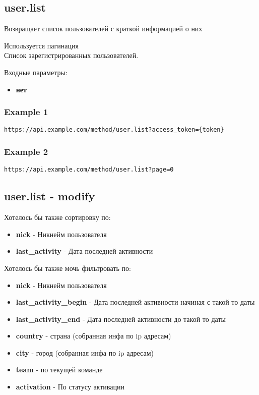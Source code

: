 \subsection{user.list}
Возвращает список пользователей с краткой информацией о них

Используется пагинация \\
Список зарегистрированных пользователей.

Входные параметры:
\begin{itemize}
  \item \textbf{нет}
\end{itemize}

\subsubsection{Example 1}
\begin{Verbatim}[frame=single]
https://api.example.com/method/user.list?access_token={token}
\end{Verbatim}

\subsubsection{Example 2}
\begin{Verbatim}[frame=single]
https://api.example.com/method/user.list?page=0
\end{Verbatim}

\subsection{user.list - modify}

\par
Хотелось бы также сортировку по:
\begin{itemize}
  \item \textbf{nick} - Никнейм пользователя
  \item \textbf{last\_activity} - Дата последней активности
\end{itemize}

\par
Хотелось бы также мочь фильтровать по:
\begin{itemize}
  \item \textbf{nick} - Никнейм пользователя
  \item \textbf{last\_activity\_begin} - Дата последней активности начиная с такой то даты
  \item \textbf{last\_activity\_end} - Дата последней активности до такой то даты
  \item \textbf{country} - страна (собранная инфа по ip адресам)
  \item \textbf{city} - город (собранная инфа по ip адресам)
  \item \textbf{team} - по текущей команде
  \item \textbf{activation} - По статусу активации
\end{itemize}
